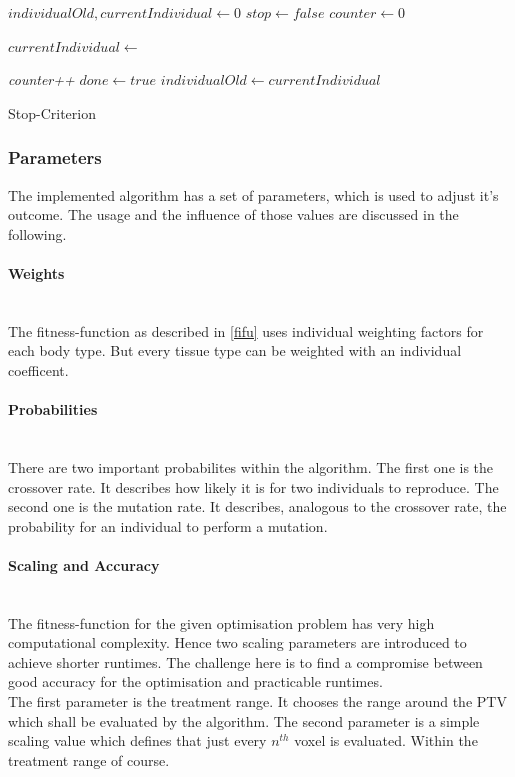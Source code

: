 \documentclass[12pt]{article}
\begin{document}
\begin{algorithm}[H]
$individualOld,currentIndividual \leftarrow 0$\;
$stop \leftarrow false$\;
$counter \leftarrow 0$\;
 {
 	
	$currentIndividual \leftarrow $\iter{}\;
	
	 {
		\emph{counter++}
	} 
	 {
		$done \leftarrow true$
	}  
	$individualOld \leftarrow currentIndividual $
	
	
	
	
	}
	 

\caption{Stop-Criterion}
\end{algorithm}  

\newpage
\subsubsection{Parameters}
The implemented algorithm has a set of parameters, which is used to adjust it's outcome. The usage and the influence of those values are discussed in the following.

\paragraph{Weights}~\\
The fitness-function as described in \ref{fifu} uses individual weighting factors for each body type.  But every tissue type can be weighted with an individual coefficent. 

\paragraph{Probabilities} ~\\ 
There are two important probabilites within the algorithm. The first one is the crossover rate. It describes how likely it is for two individuals to reproduce. The second one is the mutation rate. It describes, analogous to the crossover rate, the probability for an individual to perform a mutation. 

\paragraph{Scaling and Accuracy}~\\
The fitness-function for the given optimisation problem has very high computational complexity. Hence two scaling parameters are introduced to achieve shorter runtimes. The challenge here is to find a compromise between good accuracy for the optimisation and practicable runtimes.\\ The first parameter is the treatment range. It chooses the range around the PTV which shall be evaluated by the algorithm. The second parameter is a simple scaling value which defines that just every  $n^{th}$ voxel is evaluated. Within the treatment range of course.
\end{document}
